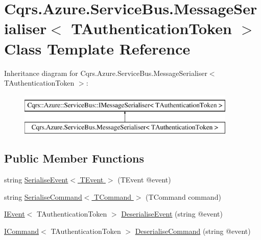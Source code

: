 \hypertarget{classCqrs_1_1Azure_1_1ServiceBus_1_1MessageSerialiser}{}\section{Cqrs.\+Azure.\+Service\+Bus.\+Message\+Serialiser$<$ T\+Authentication\+Token $>$ Class Template Reference}
\label{classCqrs_1_1Azure_1_1ServiceBus_1_1MessageSerialiser}
Inheritance diagram for Cqrs.\+Azure.\+Service\+Bus.\+Message\+Serialiser$<$ T\+Authentication\+Token $>$\+:\begin{figure}[H]
\begin{center}
\leavevmode
\includegraphics[height=2.000000cm]{classCqrs_1_1Azure_1_1ServiceBus_1_1MessageSerialiser}
\end{center}
\end{figure}
\subsection*{Public Member Functions}
\begin{DoxyCompactItemize}
\item 
string \hyperlink{classCqrs_1_1Azure_1_1ServiceBus_1_1MessageSerialiser_a596224ec927c673958e72a2153931c09_a596224ec927c673958e72a2153931c09}{Serialise\+Event$<$ T\+Event $>$} (T\+Event @event)
\item 
string \hyperlink{classCqrs_1_1Azure_1_1ServiceBus_1_1MessageSerialiser_a50107f67d604c45136d9fa3d73400e3a_a50107f67d604c45136d9fa3d73400e3a}{Serialise\+Command$<$ T\+Command $>$} (T\+Command command)
\item 
\hyperlink{interfaceCqrs_1_1Events_1_1IEvent}{I\+Event}$<$ T\+Authentication\+Token $>$ \hyperlink{classCqrs_1_1Azure_1_1ServiceBus_1_1MessageSerialiser_a7b96e89475e9218fcb7a690fe4d02279_a7b96e89475e9218fcb7a690fe4d02279}{Deserialise\+Event} (string @event)
\item 
\hyperlink{interfaceCqrs_1_1Commands_1_1ICommand}{I\+Command}$<$ T\+Authentication\+Token $>$ \hyperlink{classCqrs_1_1Azure_1_1ServiceBus_1_1MessageSerialiser_a7cbab381f4758f8dd04cd17e2c5f2c3a_a7cbab381f4758f8dd04cd17e2c5f2c3a}{Deserialise\+Command} (string @event)
\end{DoxyCompactItemize}
